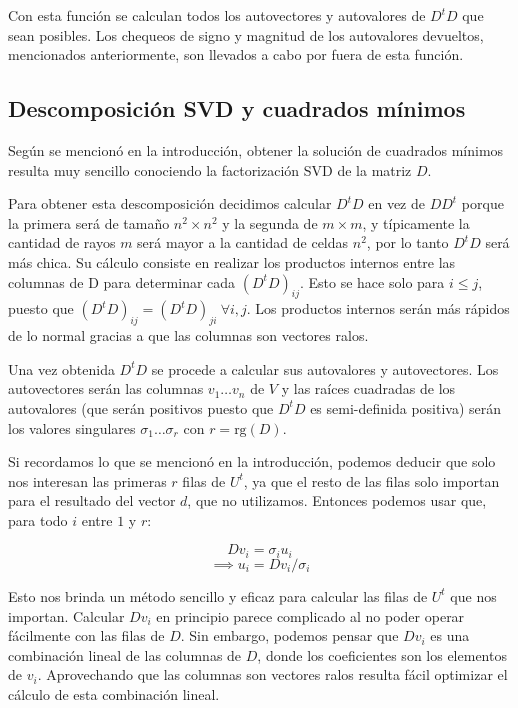 \documentclass[a4paper]{article}
\begin{document}
Con esta función se calculan todos los autovectores y autovalores de $D^tD$ que sean posibles. Los chequeos de signo y magnitud de los autovalores 
devueltos, mencionados anteriormente, son llevados a cabo por fuera de esta función.

\subsection{Descomposición SVD y cuadrados mínimos}

Según se mencionó en la introducción, obtener la solución de cuadrados mínimos resulta muy sencillo conociendo la factorización SVD de la matriz 
$D$.

Para obtener esta descomposición decidimos calcular $D^t D$ en vez de $DD^t$ porque la primera será de tamaño $n^2 \times n^2$ y la segunda 
de $m \times m$, y típicamente la cantidad de rayos $m$ será mayor a la cantidad de celdas $n^2$, por lo tanto $D^t D$ será más chica.
Su cálculo consiste en realizar los productos internos entre las columnas de D para determinar cada $(D^t D)_{ij}$. Esto se hace solo para 
$i \leq j$, puesto que $(D^t D)_{ij} = (D^t D)_{ji}\ \forall i,j$. Los productos internos serán más rápidos de lo normal gracias a que 
las columnas son vectores ralos.

Una vez obtenida $D^t D$ se procede a calcular sus autovalores y autovectores. Los autovectores serán las columnas $v_1 \ldots v_n$ de $V$ y 
las raíces cuadradas de los autovalores (que serán positivos puesto que $D^t D$ es semi-definida positiva) serán los valores singulares 
$\sigma_1 \ldots \sigma_r$ con $r = \text{rg}(D)$.

Si recordamos lo que se mencionó en la introducción, podemos deducir que solo nos interesan las primeras $r$ filas de $U^t$, ya que el resto 
de las filas solo importan para el resultado del vector $d$, que no utilizamos. Entonces podemos usar que, para todo $i$ entre $1$ y $r$:

\[
D v_i = \sigma_i u_i
\]
\[
\implies u_i = D v_i / \sigma_i
\]

Esto nos brinda un método sencillo y eficaz para calcular las filas de $U^t$ que nos importan. Calcular $D v_i$ en principio parece complicado 
al no poder operar fácilmente con las filas de $D$. Sin embargo, podemos pensar que $D v_i$ es una combinación lineal de las columnas de $D$,
donde los coeficientes son los elementos de $v_i$. Aprovechando que las columnas son vectores ralos resulta fácil optimizar el cálculo de 
esta combinación lineal.
\end{document}
